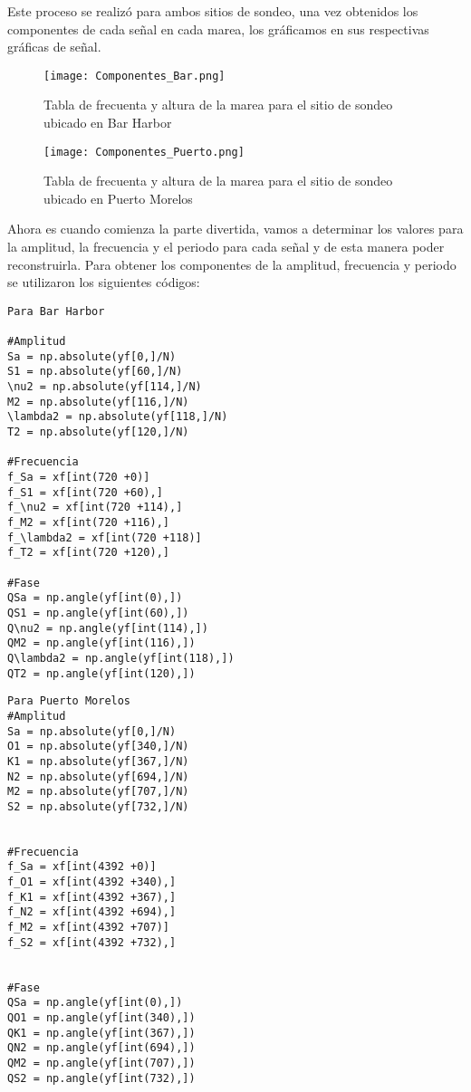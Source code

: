 \documentclass{article}
\begin{document}
Este proceso se realizó para ambos sitios de sondeo, una vez obtenidos los componentes de cada señal en cada marea, los gráficamos en sus respectivas gráficas de señal.
\begin{figure}[h]
\centering
\texttt{[image: Componentes\_Bar.png]}
\caption{Tabla de frecuenta y altura de la marea para el sitio de sondeo ubicado en Bar Harbor}
\end{figure}
\begin{figure}[h]
\centering
\texttt{[image: Componentes\_Puerto.png]}
\caption{Tabla de frecuenta y altura de la marea para el sitio de sondeo ubicado en Puerto Morelos}
\end{figure}
Ahora es cuando comienza la parte divertida, vamos a determinar los valores para la amplitud, la frecuencia y el periodo para cada señal y de esta manera poder reconstruirla. Para obtener los componentes de la amplitud, frecuencia y periodo se utilizaron los siguientes códigos:\\
\newpage
\twocolumn
\begin{verbatim}
Para Bar Harbor

#Amplitud
Sa = np.absolute(yf[0,]/N)
S1 = np.absolute(yf[60,]/N)
\nu2 = np.absolute(yf[114,]/N)
M2 = np.absolute(yf[116,]/N)
\lambda2 = np.absolute(yf[118,]/N)
T2 = np.absolute(yf[120,]/N)

#Frecuencia
f_Sa = xf[int(720 +0)]
f_S1 = xf[int(720 +60),]
f_\nu2 = xf[int(720 +114),]
f_M2 = xf[int(720 +116),]
f_\lambda2 = xf[int(720 +118)]
f_T2 = xf[int(720 +120),]

#Fase
QSa = np.angle(yf[int(0),])
QS1 = np.angle(yf[int(60),])
Q\nu2 = np.angle(yf[int(114),])
QM2 = np.angle(yf[int(116),])
Q\lambda2 = np.angle(yf[int(118),])
QT2 = np.angle(yf[int(120),])
\end{verbatim}
\pagebreak
\begin{verbatim}
Para Puerto Morelos
#Amplitud
Sa = np.absolute(yf[0,]/N)
O1 = np.absolute(yf[340,]/N)
K1 = np.absolute(yf[367,]/N)
N2 = np.absolute(yf[694,]/N)
M2 = np.absolute(yf[707,]/N)
S2 = np.absolute(yf[732,]/N)


#Frecuencia
f_Sa = xf[int(4392 +0)]
f_O1 = xf[int(4392 +340),]
f_K1 = xf[int(4392 +367),]
f_N2 = xf[int(4392 +694),]
f_M2 = xf[int(4392 +707)]
f_S2 = xf[int(4392 +732),]


#Fase
QSa = np.angle(yf[int(0),])
QO1 = np.angle(yf[int(340),])
QK1 = np.angle(yf[int(367),])
QN2 = np.angle(yf[int(694),])
QM2 = np.angle(yf[int(707),])
QS2 = np.angle(yf[int(732),])
\end{verbatim}
\end{document}
